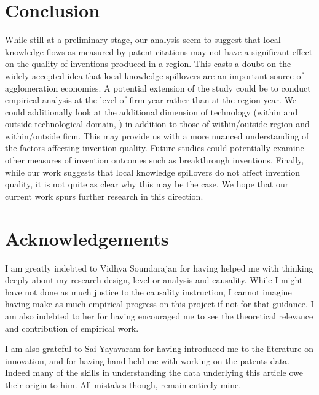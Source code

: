 \documentclass[12pt]{article}
\begin{document}
\section*{Conclusion}
While still at a preliminary stage, our analysis seem to suggest that local knowledge flows as measured by patent citations may not have a significant effect on the quality of inventions produced in a region. This casts a doubt on the widely accepted idea that local knowledge spillovers are an important source of agglomeration economies. A potential extension of the study could be to conduct empirical analysis at the level of firm-year rather than at the region-year. We could additionally look at the additional dimension of technology (within and outside technological domain, \cite{Rosenkopf2001}) in addition to those of within/outside region and within/outside firm. This may provide us with a more nuanced understanding of the factors affecting invention quality. Future studies could potentially examine other measures of invention outcomes such as breakthrough inventions. Finally, while our work suggests that local knowledge spillovers do not affect invention quality, it is not quite as clear why this may be the case. We hope that our current work spurs further research in this direction.


\section*{Acknowledgements}
I am greatly indebted to Vidhya Soundarajan for having helped me with thinking deeply about my research design, level or analysis and causality. While I might have not done as much justice to the causality instruction, I cannot imagine having make as much empirical progress on this project if not for that guidance. I am also indebted to her for having encouraged me to see the theoretical relevance and contribution of empirical work.

I am also grateful to Sai Yayavaram for having introduced me to the literature on innovation, and for having hand held me with working on the patents data. Indeed many of the skills in understanding the data underlying this article owe their origin to him. All mistakes though, remain entirely mine.

\newpage
 

\end{document}

